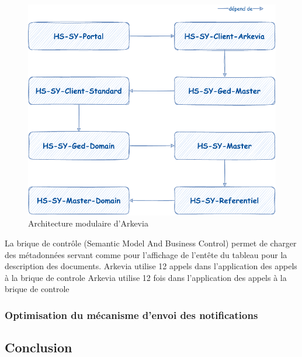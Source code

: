 \begin{figure}[H]
    \begin{center}
        \includegraphics[width=0.56\linewidth]{images/sec4/modules-arkevia.pdf}
        \caption{Architecture modulaire d'Arkevia}
        \label{fig:modules_arkevia}
    \end{center}
\end{figure}
La brique de contrôle (Semantic Model And Business Control) permet de charger des métadonnées servant comme pour l'affichage de l'entête du tableau pour la description des documents.
Arkevia utilise 12 appels dans l'application des appels à la brique de controle 
Arkevia utilise 12 fois dans l'application des appels à la brique de controle 
\subsubsection{Optimisation du mécanisme d'envoi des notifications}

\subsection{Conclusion}
